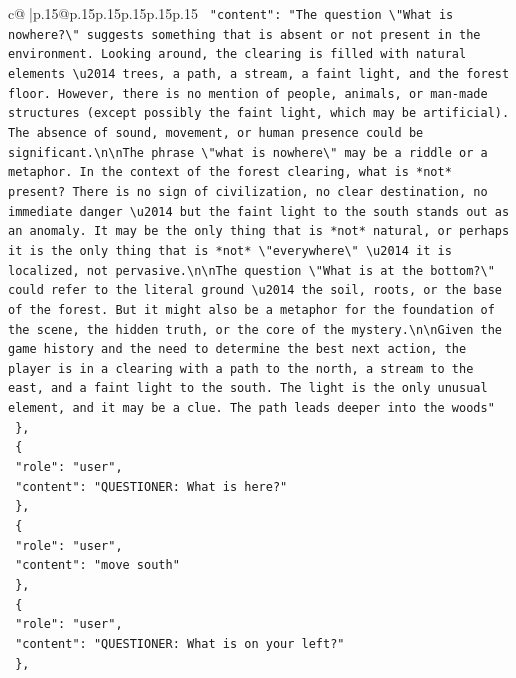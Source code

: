 \documentclass{article}
\begin{document}
{\begin{supertabular}{c@{$\;$}|p{.15\linewidth}@{}p{.15\linewidth}p{.15\linewidth}p{.15\linewidth}p{.15\linewidth}p{.15\linewidth}}
{{{\texttt{    "content": "The question \textbackslash{}"What is nowhere?\textbackslash{}" suggests something that is absent or not present in the environment. Looking around, the clearing is filled with natural elements \textbackslash{}u2014 trees, a path, a stream, a faint light, and the forest floor. However, there is no mention of people, animals, or man{-}made structures (except possibly the faint light, which may be artificial). The absence of sound, movement, or human presence could be significant.\textbackslash{}n\textbackslash{}nThe phrase \textbackslash{}"what is nowhere\textbackslash{}" may be a riddle or a metaphor. In the context of the forest clearing, what is *not* present? There is no sign of civilization, no clear destination, no immediate danger \textbackslash{}u2014 but the faint light to the south stands out as an anomaly. It may be the only thing that is *not* natural, or perhaps it is the only thing that is *not* \textbackslash{}"everywhere\textbackslash{}" \textbackslash{}u2014 it is localized, not pervasive.\textbackslash{}n\textbackslash{}nThe question \textbackslash{}"What is at the bottom?\textbackslash{}" could refer to the literal ground \textbackslash{}u2014 the soil, roots, or the base of the forest. But it might also be a metaphor for the foundation of the scene, the hidden truth, or the core of the mystery.\textbackslash{}n\textbackslash{}nGiven the game history and the need to determine the best next action, the player is in a clearing with a path to the north, a stream to the east, and a faint light to the south. The light is the only unusual element, and it may be a clue. The path leads deeper into the woods"} \\
\texttt{  \},} \\
\texttt{  \{} \\
\texttt{    "role": "user",} \\
\texttt{    "content": "QUESTIONER: What is here?"} \\
\texttt{  \},} \\
\texttt{  \{} \\
\texttt{    "role": "user",} \\
\texttt{    "content": "move south"} \\
\texttt{  \},} \\
\texttt{  \{} \\
\texttt{    "role": "user",} \\
\texttt{    "content": "QUESTIONER: What is on your left?"} \\
\texttt{  \},} \\
}}}
\end{supertabular}}
\end{document}

